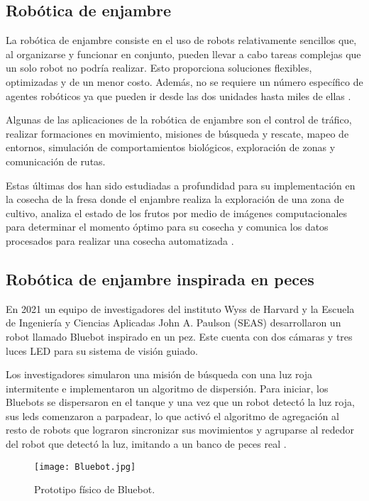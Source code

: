 \subsection*{Robótica de enjambre}
La robótica de enjambre consiste en el uso de robots relativamente sencillos que, al organizarse y funcionar en conjunto, pueden llevar a cabo tareas complejas que un solo robot no podría realizar. Esto proporciona soluciones flexibles, optimizadas y de un menor costo. Además, no se requiere un número específico de agentes robóticos ya que pueden ir desde las dos unidades hasta miles de ellas \cite{UNIDIRswarm}.

Algunas de las aplicaciones de la robótica de enjambre son el control de tráfico, realizar formaciones en movimiento, misiones de búsqueda y rescate, mapeo de entornos, simulación de comportamientos biológicos, exploración de zonas y comunicación de rutas. 

Estas últimas dos han sido estudiadas a profundidad para su implementación en la cosecha de la fresa donde el enjambre realiza la exploración de una zona de cultivo, analiza el estado de los frutos por medio de imágenes computacionales para determinar el momento óptimo para su cosecha y comunica los datos procesados para realizar una cosecha automatizada \cite{EnjambresCultivos}.

\subsection*{Robótica de enjambre inspirada en peces}
En 2021 un equipo de investigadores del instituto Wyss de Harvard y la Escuela de Ingeniería y Ciencias Aplicadas John A. Paulson (SEAS) desarrollaron un robot llamado Bluebot inspirado en un pez. Este cuenta con dos cámaras y tres luces LED para su sistema de visión guiado. 

Los investigadores simularon una misión de búsqueda con una luz roja intermitente e implementaron un algoritmo de dispersión. Para iniciar, los Bluebots se dispersaron en el tanque y una vez que un robot detectó la luz roja, sus leds comenzaron a parpadear, lo que activó el algoritmo de agregación al resto de robots que lograron sincronizar sus movimientos y agruparse al rededor del robot que detectó la luz, imitando a un banco de peces real \cite{Bluebot}.

\begin{figure}[H]
	\centering
	\texttt{[image: Bluebot.jpg]}
	\caption{Prototipo físico de Bluebot\cite{Bluebot}.}
	\label{fig:bluebot}
\end{figure}

